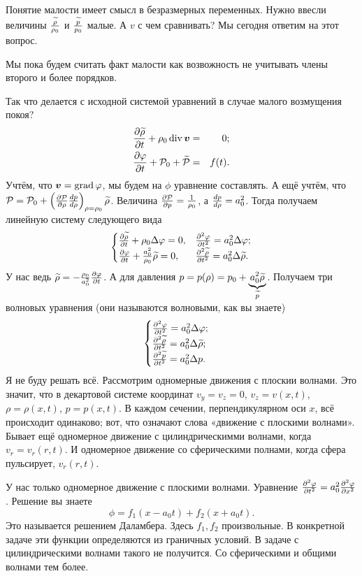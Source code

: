 Понятие малости имеет смысл в безразмерных переменных. Нужно ввесли величины $\frac{\widetilde{\rho}{}}{\rho_0}$ и $\frac{\widetilde{p}{}}{p_0}$ малые. А $v$ с чем сравнивать? Мы сегодня ответим на этот вопрос.

Мы пока будем считать факт малости как возвожность не учитывать члены второго и более порядков.

Так что делается с исходной системой уравнений в случае малого возмущения покоя?
\begin{eqnarray}
	\frac{\partial \widetilde{\rho}{}}{\partial t} +\rho_0 \operatorname{div}\boldsymbol{v}&=&0;\\
	\frac{\partial \varphi}{\partial t} + \mathcal P_0 + \widetilde{\mathcal P}{} &=& f(t).
\end{eqnarray}
Учтём, что $\boldsymbol{v} = \operatorname{grad} \varphi$, мы будем на $\phi$ уравнение составлять. А ещё учтём, что $\mathcal P = \mathcal P_0 + \left(\frac{\partial \mathcal P}{\partial \rho}\frac{dp}{d\rho}\right)_{\rho = \rho_0}\widetilde{\rho}{}$. Величина $\frac{\partial \mathcal P}{\partial p} = \frac1{\rho_0}$, а $\frac{dp}{d\rho} = a_0^2$. Тогда получаем линейную систему следующего вида
\[
	\begin{cases}
		\frac{\partial \widetilde{\rho}{}}{\partial t} + \rho_0\Delta\varphi = 0, &
		\frac{\partial ^2\varphi}{\partial t^2} = a_0^2\Delta\varphi;\\
		\frac{\partial \varphi}{\partial t} + \frac{a_0^2}{\rho_0}\widetilde{\rho}{} = 0,&
		\frac{\partial ^2\widetilde{\rho}{}}{\partial t^2} = a_0^2\Delta\widetilde{\rho}{}.	
	\end{cases}
\]
У нас ведь $\widetilde{\rho}{} = -\frac{\rho_0}{a_0^2}\frac{\partial \varphi}{\partial t}$. А для давления $p = p(\rho) = p_0+\underbrace{a_0^2\widetilde{\rho}{}}_{\widetilde{p}{}}$. Получаем три волновых уравнения (они называются волновыми, как вы знаете)
\[
	\begin{cases}
		\frac{\partial ^2\varphi}{\partial t^2} = a_0^2\Delta\varphi;\\
		\frac{\partial ^2\widetilde{\rho}{}}{\partial t^2} = a_0^2\Delta\widetilde{\rho}{};\\
		\frac{\partial ^2\widetilde{p}{}}{\partial t^2} = a_0^2\Delta p.
	\end{cases}
\]
Я не буду решать всё. Рассмотрим одномерные движения с плоскии волнами. Это значит, что в декартовой системе координат $v_y= v_z=0$, $v_z = v(x,t)$, $\rho = \rho(x,t)$, $p = p(x,t)$.
В каждом сечении, перпендикулярном оси $x$, всё происходит одинаково; вот, что означают слова «движение с плоскими волнами».
Бывает ещё одномерное движение с цилиндрическимми волнами, когда $v_r = v_r(r,t)$.
И одномерное движение со сферическими полнами, когда сфера пульсирует, $v_r(r,t)$.

У нас только одномерное движение с плоскими волнами. Уравнение $\frac{\partial ^2\varphi}{\partial t^2} = a_0^2\frac{\partial ^2\varphi}{\partial x^2}$. Решение вы знаете
\[
	\phi = f_1(x-a_0t) + f_2(x+a_0t).
\]
Это называется решением Даламбера.
Здесь $f_1,f_2$ произвольные. В конкретной задаче эти функции определяются из граничных условий. В задаче с цилиндрическими волнами такого не получится. Со сферическими и общими волнами тем более. 

